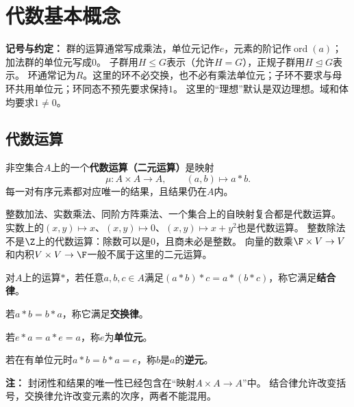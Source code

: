 \chapter{代数基本概念}
\label{p2:ch1}


\textbf{记号与约定：}
群的运算通常写成乘法，单位元记作$e$，元素的阶记作$\operatorname{ord}(a)$；加法群的单位元写成$0$。
子群用$H\leq G$表示（允许$H=G$），正规子群用$H\trianglelefteq G$表示。
环通常记为$R$。这里的环不必交换，也不必有乘法单位元；子环不要求与母环共用单位元；环同态不预先要求保持$1$。
这里的“理想”默认是双边理想。域和体均要求$1\neq0$。


\section{代数运算}


\begin{definition}
\label{p2:concept:c1-l19}非空集合$A$上的一个\textbf{代数运算（二元运算）}是映射
\[
\mu:A\times A\longrightarrow A,\qquad(a,b)\longmapsto a*b.
\]
每一对有序元素都对应唯一的结果，且结果仍在$A$内。
\end{definition}

\begin{example}
整数加法、实数乘法、同阶方阵乘法、一个集合上的自映射复合都是代数运算。
实数上的$(x,y)\mapsto x$、$(x,y)\mapsto0$、$(x,y)\mapsto x+y^2$也是代数运算。
整数除法不是$\Z$上的代数运算：除数可以是$0$，且商未必是整数。
向量的数乘$\F\times V\to V$和内积$V\times V\to\F$一般不属于这里的二元运算。
\end{example}

\begin{definition}
\label{p2:concept:c1-l34}对$A$上的运算$*$，若任意$a,b,c\in A$满足$(a*b)*c=a*(b*c)$，称它满足\textbf{结合律}。


\label{p2:concept:c1-l37}若$a*b=b*a$，称它满足\textbf{交换律}。


\label{p2:concept:c1-l40}若$e*a=a*e=a$，称$e$为\textbf{单位元}。

\label{p2:concept:c1-l42}若在有单位元时$a*b=b*a=e$，称$b$是$a$的\textbf{逆元}。
\end{definition}

\textbf{注：}
封闭性和结果的唯一性已经包含在“映射$A\times A\to A$”中。
结合律允许改变括号，交换律允许改变元素的次序，两者不能混用。


